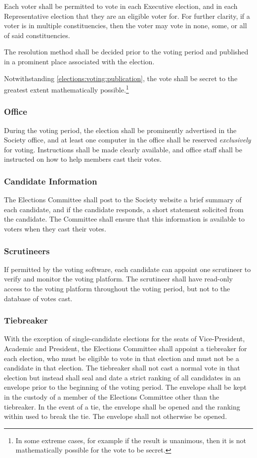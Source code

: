 Each voter shall be permitted to vote in each Executive election, and in each Representative election that they are an eligible voter for.
For further clarity, if a voter is in multiple constituencies, then the voter may vote in none, some, or all of said constituencies.

The resolution method shall be decided prior to the voting period and published in a prominent place associated with the election.

Notwithstanding \cref{elections:voting:publication}, the vote shall be secret to the greatest extent mathematically possible.\footnote{In some extreme cases, for example if the result is unanimous, then it is not mathematically possible for the vote to be secret.}

\subsubsection{Office}
During the voting period, the election shall be prominently advertised in the Society office, and at least one computer in the office shall be reserved \emph{exclusively} for voting.
Instructions shall be made clearly available, and office staff shall be instructed on how to help members cast their votes.

\subsubsection{Candidate Information}
The Elections Committee shall post to the Society website a brief summary of each candidate, and if the candidate responds, a short statement solicited from the candidate.
The Committee shall ensure that this information is available to voters when they cast their votes.

\subsubsection{Scrutineers}
If permitted by the voting software, each candidate can appoint one scrutineer to verify and monitor the voting platform.
The scrutineer shall have read-only access to the voting platform throughout the voting period, but not to the database of votes cast.

\subsubsection{Tiebreaker}
With the exception of single-candidate elections for the seats of Vice-President, Academic and President, the Elections Committee shall appoint a tiebreaker for each election, who must be eligible to vote in that election and must not be a candidate in that election.
The tiebreaker shall not cast a normal vote in that election but instead shall seal and date a strict ranking of all candidates in an envelope prior to the beginning of the voting period.
The envelope shall be kept in the custody of a member of the Elections Committee other than the tiebreaker.
In the event of a tie, the envelope shall be opened and the ranking within used to break the tie.
The envelope shall not otherwise be opened.

